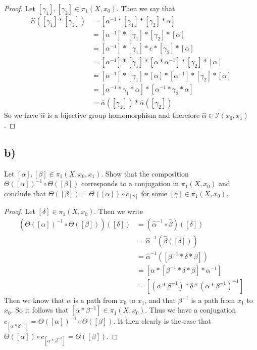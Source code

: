\documentclass{article}
\theoremstyle{definition}
\begin{document}
\begin{proof}
            Let $[\gamma_1],[\gamma_2] \in \pi_1(X,x_0)$. Then we say that 
            \begin{align*}
                \hat\alpha([\gamma_1] * [\gamma_2]) &= [\alpha^{-1} * [\gamma_1] * [\gamma_2] * \alpha]\\
                &=[ \alpha^{-1}] * [\gamma_1] * [\gamma_2 ]* [\alpha]\\
                &= [ \alpha^{-1}] * [\gamma_1] *e* [\gamma_2 ]* [\alpha]\\
                &=[ \alpha^{-1}] * [\gamma_1] *[\alpha * \alpha^{-1}] * [\gamma_2 ]* [\alpha]\\
                &=[ \alpha^{-1}] * [\gamma_1] *[\alpha]*[ \alpha^{-1}] * [\gamma_2 ]* [\alpha]\\
                &=[ \alpha^{-1} * \gamma_1 *\alpha]*[ \alpha^{-1} * \gamma_2 * \alpha]\\
                &= \hat\alpha([\gamma_1]) * \hat\alpha([\gamma_2])
            \end{align*}
            So we have $\hat \alpha$ is a bijective group homomorphism and therefore $\hat \alpha \in \mathcal{I}(x_0,x_1)$.
        \end{proof}
    \subsection*{b)}
        \begin{mdframed}
            Let $[\alpha], [\beta] \in \pi_1(X,x_0,x_1)$.
            Show that the composition $\Theta([\alpha])^{-1}\circ\Theta([\beta])$
            corresponds to a conjugation in $\pi_1(X,x_0)$ and conclude that $\Theta([\beta]) = \Theta([\alpha]) \circ c_{[\gamma]}$
            for some $[\gamma] \in \pi_1(X,x_0)$.
        \end{mdframed}
        \begin{proof}
            Let $[\delta] \in \pi_1(X,x_0)$. Then we write 
            \begin{align*}
                (\Theta([\alpha])^{-1} \circ \Theta([\beta]))([\delta]) & = (\hat\alpha^{-1} \circ \hat\beta)([\delta]) \\
                &=\hat\alpha^{-1}(\hat\beta([\delta])) \\
                &=\hat\alpha^{-1}([\beta^{-1} * \delta * \beta]) \\
                &=[\alpha * [\beta^{-1} * \delta * \beta] * \alpha^{-1}]\\
                &=[(\alpha * \beta^{-1}) * \delta * (\alpha * \beta^{-1})^{-1}]
            \end{align*}
            Then we know that $\alpha$ is a path from $x_0$ to $x_1$, and that $\beta^{-1}$ is a path from $x_1$ to $x_0$.
            So it follows that $[\alpha * \beta^{-1}] \in \pi_1(X,x_0)$. Thus we have a conjugation $c_{[\alpha * \beta^{-1}]} = \Theta([\alpha])^{-1} \circ \Theta([\beta])$.
            It then clearly is the case that $\Theta([\alpha]) \circ c_{[\alpha * \beta^{-1}]} = \Theta([\beta])$.
        \end{proof}
\end{document}
